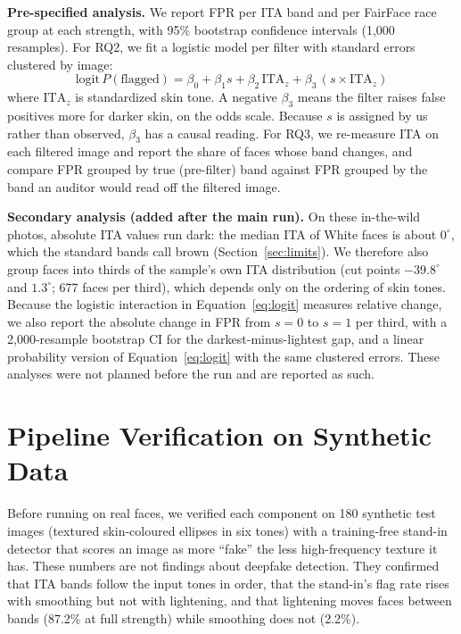 \documentclass[11pt]{article}
\begin{document}
\textbf{Pre-specified analysis.} We report FPR per ITA band and per FairFace race group at each strength, with 95\% bootstrap confidence intervals (1,000 resamples). For RQ2, we fit a logistic model per filter with standard errors clustered by image:
\begin{equation}
\mathrm{logit}\,P(\text{flagged}) = \beta_0 + \beta_1 s + \beta_2\,\mathrm{ITA}_z + \beta_3\,(s\times\mathrm{ITA}_z)
\label{eq:logit}
\end{equation}
where $\mathrm{ITA}_z$ is standardized skin tone. A negative $\beta_3$ means the filter raises false positives more for darker skin, on the odds scale. Because $s$ is assigned by us rather than observed, $\beta_3$ has a causal reading. For RQ3, we re-measure ITA on each filtered image and report the share of faces whose band changes, and compare FPR grouped by true (pre-filter) band against FPR grouped by the band an auditor would read off the filtered image.

\textbf{Secondary analysis (added after the main run).} On these in-the-wild photos, absolute ITA values run dark: the median ITA of White faces is about $0^\circ$, which the standard bands call brown (Section~\ref{sec:limits}). We therefore also group faces into thirds of the sample's own ITA distribution (cut points $-39.8^\circ$ and $1.3^\circ$; 677 faces per third), which depends only on the ordering of skin tones. Because the logistic interaction in Equation~\ref{eq:logit} measures relative change, we also report the absolute change in FPR from $s=0$ to $s=1$ per third, with a 2,000-resample bootstrap CI for the darkest-minus-lightest gap, and a linear probability version of Equation~\ref{eq:logit} with the same clustered errors. These analyses were not planned before the run and are reported as such.

\section{Pipeline Verification on Synthetic Data}
Before running on real faces, we verified each component on 180 synthetic test images (textured skin-coloured ellipses in six tones) with a training-free stand-in detector that scores an image as more ``fake'' the less high-frequency texture it has. These numbers are not findings about deepfake detection. They confirmed that ITA bands follow the input tones in order, that the stand-in's flag rate rises with smoothing but not with lightening, and that lightening moves faces between bands (87.2\% at full strength) while smoothing does not (2.2\%).
\end{document}
